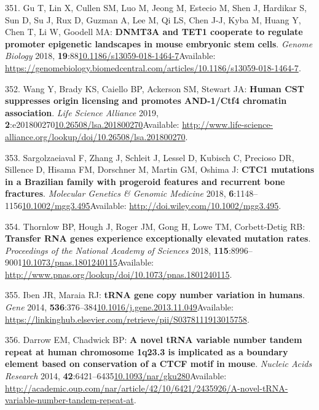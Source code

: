 \documentclass[
]{book}
\begin{document}
\leavevmode\hypertarget{ref-Gu2018}{}%
351. Gu T, Lin X, Cullen SM, Luo M, Jeong M, Estecio M, Shen J, Hardikar S, Sun D, Su J, Rux D, Guzman A, Lee M, Qi LS, Chen J-J, Kyba M, Huang Y, Chen T, Li W, Goodell MA: \textbf{DNMT3A and TET1 cooperate to regulate promoter epigenetic landscapes in mouse embryonic stem cells}. \emph{Genome Biology} 2018, \textbf{19}:88\href{https://doi.org/10.1186/s13059-018-1464-7}{10.1186/s13059-018-1464-7}Available: \url{https://genomebiology.biomedcentral.com/articles/10.1186/s13059-018-1464-7}.

\leavevmode\hypertarget{ref-Wang2019a}{}%
352. Wang Y, Brady KS, Caiello BP, Ackerson SM, Stewart JA: \textbf{Human CST suppresses origin licensing and promotes AND-1/Ctf4 chromatin association}. \emph{Life Science Alliance} 2019, \textbf{2}:e201800270\href{https://doi.org/10.26508/lsa.201800270}{10.26508/lsa.201800270}Available: \url{http://www.life-science-alliance.org/lookup/doi/10.26508/lsa.201800270}.

\leavevmode\hypertarget{ref-Sargolzaeiaval2018}{}%
353. Sargolzaeiaval F, Zhang J, Schleit J, Lessel D, Kubisch C, Precioso DR, Sillence D, Hisama FM, Dorschner M, Martin GM, Oshima J: \textbf{CTC1 mutations in a Brazilian family with progeroid features and recurrent bone fractures}. \emph{Molecular Genetics \& Genomic Medicine} 2018, \textbf{6}:1148--1156\href{https://doi.org/10.1002/mgg3.495}{10.1002/mgg3.495}Available: \url{http://doi.wiley.com/10.1002/mgg3.495}.

\leavevmode\hypertarget{ref-Thornlow2018}{}%
354. Thornlow BP, Hough J, Roger JM, Gong H, Lowe TM, Corbett-Detig RB: \textbf{Transfer RNA genes experience exceptionally elevated mutation rates}. \emph{Proceedings of the National Academy of Sciences} 2018, \textbf{115}:8996--9001\href{https://doi.org/10.1073/pnas.1801240115}{10.1073/pnas.1801240115}Available: \url{http://www.pnas.org/lookup/doi/10.1073/pnas.1801240115}.

\leavevmode\hypertarget{ref-Iben2015}{}%
355. Iben JR, Maraia RJ: \textbf{tRNA gene copy number variation in humans}. \emph{Gene} 2014, \textbf{536}:376--384\href{https://doi.org/10.1016/j.gene.2013.11.049}{10.1016/j.gene.2013.11.049}Available: \url{https://linkinghub.elsevier.com/retrieve/pii/S0378111913015758}.

\leavevmode\hypertarget{ref-Darrow2014}{}%
356. Darrow EM, Chadwick BP: \textbf{A novel tRNA variable number tandem repeat at human chromosome 1q23.3 is implicated as a boundary element based on conservation of a CTCF motif in mouse}. \emph{Nucleic Acids Research} 2014, \textbf{42}:6421--6435\href{https://doi.org/10.1093/nar/gku280}{10.1093/nar/gku280}Available: \url{http://academic.oup.com/nar/article/42/10/6421/2435926/A-novel-tRNA-variable-number-tandem-repeat-at}.
\end{document}
